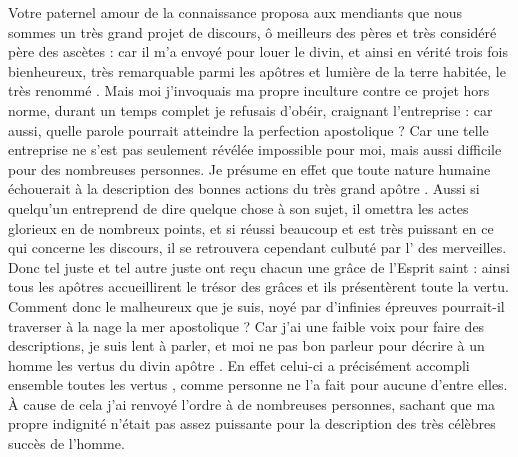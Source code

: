 




Votre  paternel amour de la connaissance proposa aux mendiants que nous  sommes un très grand projet de discours, 
ô meilleurs des pères et très considéré père des ascètes : 
car il m'a envoyé pour louer le divin,
et  ainsi en vérité trois fois bienheureux, %
très remarquable  parmi les apôtres et lumière de la terre habitée, le très renommé .
Mais moi j'invoquais ma propre  inculture  contre  ce projet hors norme, durant un temps complet je refusais d'obéir,
craignant l'entreprise :
car aussi, quelle parole pourrait atteindre la perfection apostolique ?
Car une telle entreprise ne s'est pas seulement révélée impossible pour moi, mais aussi difficile pour des nombreuses personnes. 
Je présume en effet que toute nature humaine échouerait à la description des bonnes actions du très grand apôtre .
Aussi si quelqu'un entreprend de dire quelque chose à son sujet, il omettra les actes glorieux en de nombreux points, et si  réussi beaucoup et est très puissant en ce qui concerne les discours, il se retrouvera cependant culbuté par l' des merveilles.
Donc tel juste et tel autre juste ont reçu chacun une grâce de l'Esprit saint :
ainsi tous les apôtres accueillirent le trésor des grâces et ils  présentèrent toute la  vertu. %
Comment donc le malheureux que je suis, noyé par d'infinies épreuves %
pourrait-il traverser à la nage la mer apostolique ? 
Car j'ai une faible voix pour faire des descriptions, je suis lent à parler, et moi  ne  pas  bon parleur pour décrire à un homme les vertus du divin apôtre . 
En effet celui-ci a précisément  accompli ensemble toutes les vertus  , comme personne ne l'a fait pour aucune d'entre elles.
À cause de cela j'ai renvoyé l'ordre à de nombreuses personnes, sachant que ma propre indignité n'était pas assez puissante pour la description des  très célèbres succès de l'homme.%




